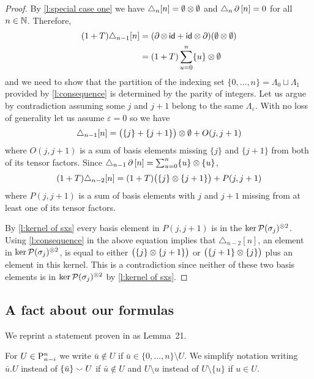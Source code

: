 \begin{proof}
	By \cref{l:special case one} we have $\triangle_{n} [n] = \emptyset \ot \emptyset$ and $\triangle_{n} \bd \, [n] = 0$ for all $n \in \N$.
	Therefore,
	\begin{align*}
	(1+T) \triangle_{n-1} [n] &=
	(\bd \ot \, \id + \id \ot \bd) (\emptyset \ot \emptyset) \\ &=
	(1+T) \sum_{u=0}^n \{u\} \ot \emptyset
	\end{align*}
	and we need to show that the partition of the indexing set $\{0, \dots, n\} = \Lambda_0 \sqcup \Lambda_1$ provided by \cref{l:consequence} is determined by the parity of integers.
	Let us argue by contradiction assuming some $j$ and $j+1$ belong to the same $\Lambda_{\varepsilon}$.
	With no loss of generality let us assume $\varepsilon = 0$ so we have
	\[
	\triangle_{n-1} [n] = \big( \{j\} + \{j+1\} \big) \ot \emptyset + O(j, j+1)
	\]
	where $O(j, j+1)$ is a sum of basis elements missing $\{j\}$ and $\{j+1\}$ from both of its tensor factors.
	Since $\triangle_{n-1} \bd \, [n] = \sum_{u=0}^{n} \{u\} \ot \{u\}$,
	\[
	(1+T) \triangle_{n-2} [n] = (1+T) \big( \{j\} \ot \{j+1\} \big) + P(j, j+1)
	\]
	where $P(j, j+1)$ is a sum of basis elements with $j$ and $j+1$ missing from at least one of its tensor factors.

	By \cref{l:kernel of sxs} every basis element in $P(j,j+1)$ is in the $\ker \cP(\sigma_j)^{\ot 2}$.
	Using \cref{l:consequence} in the above equation implies that $\triangle_{n-2}[n]$, an element in $\ker \cP(\sigma_j)^{\ot 2}$, is equal to either $\big( \{j\} \ot \{j+1\} \big)$ or $\big( \{j+1\} \ot \{j\} \big)$ plus an element in this kernel.
	This is a contradiction since neither of these two basis elements is in $\ker \cP(\sigma_j)^{\ot 2}$ by \cref{l:kernel of sxs}.
\end{proof}

\subsection{A fact about our formulas}\label{ss:fact}

We reprint a statement proven in \cite{medina2023fast_sq} as Lemma~21.

\begin{notation*}
	For $U \in \P_{n-i}^n$ we write $\bar u \notin U$ if $\bar u \in \{0, \dots, n\} \setminus U$.
	We simplify notation writing $\bar u.U$ instead of $\{\bar u\} \union U$ if $\bar u \notin U$ and $U \setminus u$ instead of $U \setminus \{u\}$ if $u \in U$.
\end{notation*}

